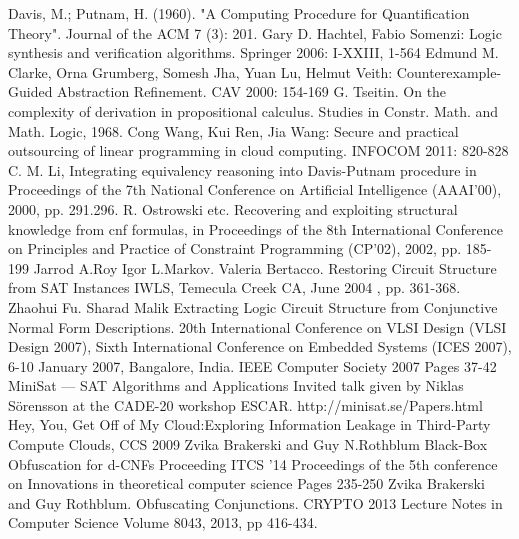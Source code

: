 \documentclass[runningheads,a4paper]{llncs}
\begin{document}
\noindent [1]	Davis, M.; Putnam, H. (1960). "A Computing Procedure for Quantification Theory". Journal of the ACM 7 (3): 201.
\newline [2]	Gary D. Hachtel, Fabio Somenzi: Logic synthesis and verification algorithms. Springer 2006: I-XXIII, 1-564
\newline [3]	Edmund M. Clarke, Orna Grumberg, Somesh Jha, Yuan Lu, Helmut Veith: Counterexample-Guided Abstraction Refinement. CAV 2000: 154-169
\newline [4]	G. Tseitin. On the complexity of derivation in propositional calculus. Studies in Constr. Math. and Math. Logic, 1968.
\newline[5]	Cong Wang, Kui Ren, Jia Wang: Secure and practical outsourcing of linear programming in cloud computing. INFOCOM 2011: 820-828
\newline[6]	C. M. Li, Integrating equivalency reasoning into Davis-Putnam procedure in Proceedings of the 7th National Conference on Artificial Intelligence (AAAI'00), 2000, pp. 291.296.
\newline[7]	R. Ostrowski etc. Recovering and exploiting structural knowledge from cnf formulas, in Proceedings of the 8th International Conference on Principles and Practice of Constraint Programming (CP'02), 2002, pp. 185-199
\newline[8]	Jarrod A.Roy Igor L.Markov. Valeria Bertacco. Restoring Circuit Structure from SAT Instances IWLS, Temecula Creek CA, June 2004 , pp. 361-368.
\newline[9]	Zhaohui Fu. Sharad Malik Extracting Logic Circuit Structure from Conjunctive Normal Form Descriptions. 20th International Conference on VLSI Design (VLSI Design 2007), Sixth International Conference on Embedded Systems (ICES 2007), 6-10 January 2007, Bangalore, India. IEEE Computer Society 2007 Pages 37-42
\newline[10]	MiniSat — SAT Algorithms and Applications Invited talk given by Niklas Sörensson at the CADE-20 workshop ESCAR. http://minisat.se/Papers.html
\newline[11]	Hey, You, Get Off of My Cloud:Exploring Information Leakage in Third-Party Compute Clouds, CCS 2009
\newline[12]	Zvika Brakerski and Guy N.Rothblum Black-Box Obfuscation for d-CNFs  Proceeding ITCS '14 Proceedings of the 5th conference on Innovations in theoretical computer science Pages 235-250 
\newline[13]	Zvika Brakerski and Guy Rothblum. Obfuscating Conjunctions. CRYPTO 2013 Lecture Notes in Computer Science Volume 8043, 2013, pp 416-434. 
\end{document}
